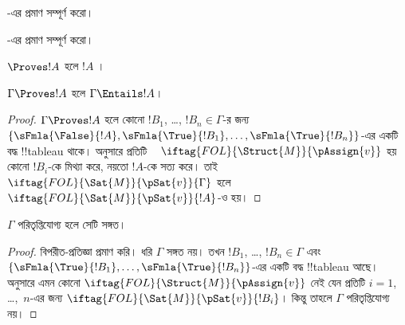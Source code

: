 \documentclass[../../../include/open-logic-section]{subfiles}
\begin{document}
\begin{prob}
-এর প্রমাণ সম্পূর্ণ করো।
\end{prob}
\tagendprob

\begin{prob}
-এর প্রমাণ সম্পূর্ণ করো।
\end{prob}
\tagendprob

\begin{cor}
$\Proves !A$ হলে $!A$ ।
\end{cor}

\begin{cor}
$\Gamma \Proves !A$ হলে $\Gamma \Entails !A$।
\end{cor}

\begin{proof}
  $\Gamma \Proves !A$ হলে কোনো
  $!B_1$, \dots, $!B_n\in\Gamma$-র জন্য
  $\{\sFmla{\False}{!A}, \sFmla{\True}{!B_1}, \dots,
  \sFmla{\True}{!B_n}\}$-এর একটি বদ্ধ !!{tableau} থাকে।
   অনুসারে প্রতিটি
  ~
  $\iftag{FOL}{\Struct{M}}{\pAssign{v}}$ হয় কোনো $!B_i$-কে মিথ্যা
  করে, নয়তো $!A$-কে সত্য করে। তাই
  $\iftag{FOL}{\Sat{M}}{\pSat{v}}{\Gamma}$ হলে
  $\iftag{FOL}{\Sat{M}}{\pSat{v}}{!A}$-ও হয়।
\end{proof}

\begin{cor}
$\Gamma$ পরিতৃপ্তিযোগ্য হলে সেটি সঙ্গত।
\end{cor}

\begin{proof}
বিপরীত-প্রতিজ্ঞা প্রমাণ করি। ধরি $\Gamma$ সঙ্গত নয়। তখন
$!B_1$, \dots, $!B_n\in\Gamma$ এবং
$\{\sFmla{\True}{!B_1}, \dots, \sFmla{\True}{!B_n}\}$-এর একটি বদ্ধ
!!{tableau} আছে।  অনুসারে এমন কোনো
$\iftag{FOL}{\Struct{M}}{\pAssign{v}}$ নেই যেন প্রতিটি
$i=1$, \dots,~$n$-এর জন্য
$\iftag{FOL}{\Sat{M}}{\pSat{v}}{!B_i}$। কিন্তু তাহলে $\Gamma$
পরিতৃপ্তিযোগ্য নয়।
\end{proof}
\end{document}
